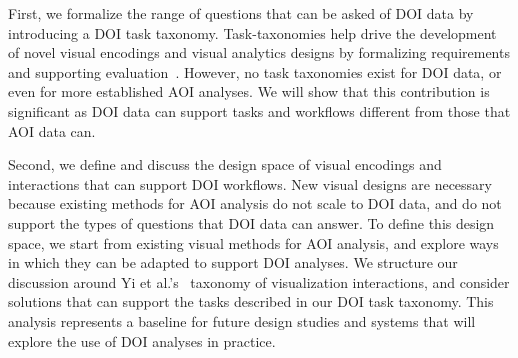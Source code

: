 First, we formalize the range of questions that can be asked of DOI data by introducing a DOI task taxonomy. Task-taxonomies help drive the development of novel visual encodings and visual analytics designs by formalizing requirements and supporting evaluation~\cite{amar2005low,okoe2015graphunit}. However, no task taxonomies exist for DOI data, or even for more established AOI analyses. We will show that this contribution is significant as DOI data can support tasks and workflows different from those that AOI data can.

Second, we define and discuss the design space of visual encodings and interactions that can support DOI workflows. New visual designs are necessary because existing methods for AOI analysis do not scale to DOI data, and do not support the types of questions that DOI data can answer. To define this design space, we start from existing visual methods for AOI analysis, and explore ways in which they can be adapted to support DOI analyses. We structure our discussion around Yi et al.'s~\cite{yi2007toward} taxonomy of visualization interactions, and consider solutions that can support the tasks described in our DOI task taxonomy. This analysis represents a baseline for future design studies and systems that will explore the use of DOI analyses in practice.



